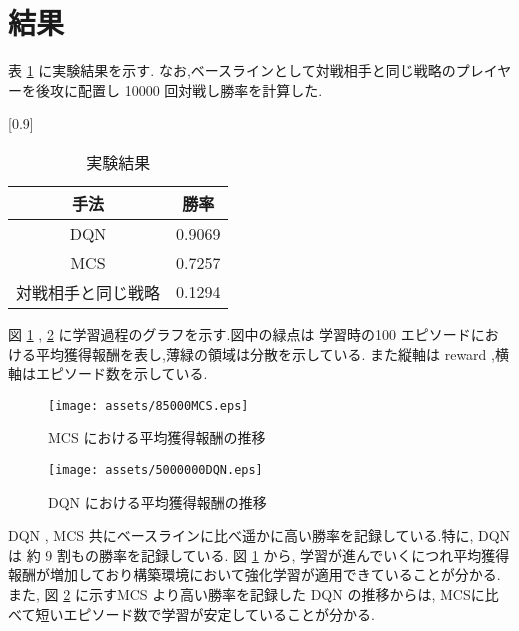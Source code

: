 \documentclass[twocolumn]{jarticle}     %
\begin{document}
\section{結果}
表 \ref{table:result} に実験結果を示す. なお,ベースラインとして対戦相手と同じ戦略のプレイヤーを後攻に配置し 10000 回対戦し勝率を計算した.
\begin{table}[H]
  \centering
  \caption{実験結果}
  \vspace{-0.3cm}
  \label{table:result}
  \scalebox{0.9}[0.9]{
    \begin{tabular}{|c|c|}
      \hline
      手法 & 勝率 \\ \hline \hline
      DQN & 0.9069 \\ \hline
      MCS & 0.7257 \\ \hline     
      対戦相手と同じ戦略 & 0.1294 \\ \hline

      \end{tabular}
  }
  \end{table}

  図 \ref{fig:MCSresult} , \ref{fig:DQNresult} に学習過程のグラフを示す.図中の緑点は 学習時の100 エピソードにおける平均獲得報酬を表し,薄緑の領域は分散を示している.
  また縦軸は reward ,横軸はエピソード数を示している. 

  \begin{figure}[H]
    \centering
    \texttt{[image: assets/85000MCS.eps]}
    \caption{MCS における平均獲得報酬の推移}
    \label{fig:MCSresult}
  \end{figure}

  \begin{figure}[H]
    \centering
    \texttt{[image: assets/5000000DQN.eps]}
    \caption{DQN における平均獲得報酬の推移}
    \label{fig:DQNresult}
  \end{figure}
DQN , MCS 共にベースラインに比べ遥かに高い勝率を記録している.特に, DQN は 約 9 割もの勝率を記録している.
図 \ref{fig:MCSresult} から, 学習が進んでいくにつれ平均獲得報酬が増加しており構築環境において強化学習が適用できていることが分かる.
また, 図 \ref{fig:DQNresult} に示すMCS より高い勝率を記録した DQN の推移からは, MCSに比べて短いエピソード数で学習が安定していることが分かる.
  
\end{document}
